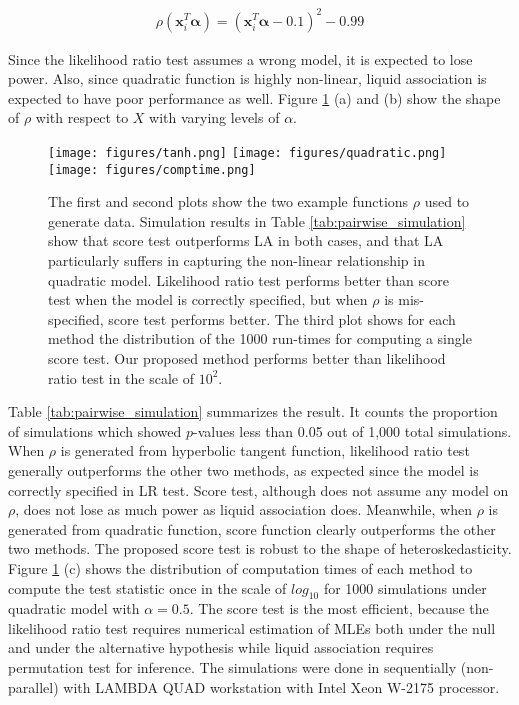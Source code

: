 \documentclass[aap,authoryear, preprint]{imsart}
\numberwithin{equation}{section}
\theoremstyle{plain}
\begin{document}
\begin{align}
    \rho(\bm{x}_i^T\bm{\alpha}) = (\bm{x}_i^T\bm{\alpha} - 0.1)^2 - 0.99
    \label{eq:data_generating2_quadratic}
\end{align}

Since the likelihood ratio test assumes a wrong model, it is expected to lose power. Also, since quadratic function is highly non-linear, liquid association is expected to have poor performance as well. Figure \ref{fig:sim} (a) and (b) show the shape of $\rho$ with respect to $X$ with varying levels of $\alpha$. \\
\begin{figure}
         \texttt{[image: figures/tanh.png]}
         \texttt{[image: figures/quadratic.png]}
         \texttt{[image: figures/comptime.png]}
        \caption{The first and second plots show the two example functions $\rho$ used to generate data. Simulation results in Table \ref{tab:pairwise_simulation} show that score test outperforms LA in both cases, and that LA particularly suffers in capturing the non-linear relationship in quadratic model. Likelihood ratio test performs better than score test when the model is correctly specified, but when $\rho$ is mis-specified, score test performs better. The third plot shows for each method the distribution of the 1000 run-times for computing a single score test. Our proposed method performs better than likelihood ratio test in the scale of $10^2$.}
        \label{fig:sim}
\end{figure}

Table \ref{tab:pairwise_simulation} summarizes the result. It counts the proportion of simulations which showed $p$-values less than 0.05 out of 1,000 total simulations. When $\rho$ is generated from hyperbolic tangent function, likelihood ratio test generally outperforms the other two methods, as expected since the model is correctly specified in LR test. Score test, although does not assume any model on $\rho$, does not lose as much power as liquid association does. Meanwhile, when $\rho$ is generated from quadratic function, score function clearly outperforms the other two methods. The proposed score test is robust to the shape of heteroskedasticity. Figure \ref{fig:sim} (c) shows the distribution of computation times of each method to compute the test statistic once in the scale of $log_{10}$ for 1000 simulations under quadratic model with $\alpha = 0.5$. The score test is the most efficient, because the likelihood ratio test requires numerical estimation of MLEs both under the null and under the alternative hypothesis while liquid association requires permutation test for inference. The simulations were done in sequentially (non-parallel) with LAMBDA QUAD workstation with Intel Xeon W-2175 processor.
\end{document}
